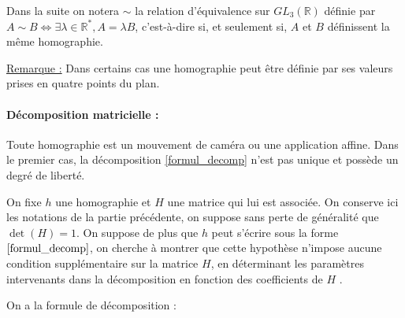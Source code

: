 Dans la suite on notera $\sim$ la relation d'équivalence  sur $GL_{3}(\mathbb{R})$ définie par $A\sim B \iff \exists \lambda\in \mathbb{R}^{*} , A=\lambda B$, c'est-à-dire si, et seulement si, $A$ et $B$ définissent la même homographie.

\underline{Remarque :} Dans certains cas une homographie peut être définie par ses valeurs prises en quatre points du plan.



\paragraph{Décomposition matricielle :}
\begin{prop}
Toute homographie est un mouvement de caméra ou une application affine. Dans le premier cas, la décomposition \ref{formul_decomp} n'est pas unique et possède un degré de liberté.
\end{prop}
On fixe $h$ une homographie et $H$ une matrice qui lui est associée. On conserve ici les notations de la partie précédente, on suppose sans perte de généralité que $\det (H)=1$. On suppose de plus que $h$ peut s'écrire sous la forme $\ref{formul_decomp}$, on cherche à montrer que cette hypothèse n'impose aucune condition supplémentaire sur la matrice $H$, en déterminant les paramètres intervenants dans la décomposition en fonction des coefficients de $H$ .

On a la formule de décomposition :

